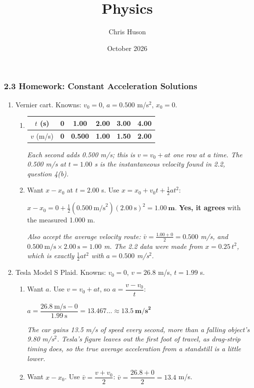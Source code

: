 \documentclass[12pt, twoside]{article}
\title{Physics}
\author{Chris Huson}
\date{October 2026}
\begin{document}
\subsubsection*{2.3 Homework: Constant Acceleration Solutions}

\begin{enumerate}[itemsep=0.5cm]

\item Vernier cart. Knowns: $v_0 = 0$, $a = 0.500$ m/s$^2$, $x_0 = 0$.
  \begin{enumerate}[itemsep=0.3cm]
    \item \renewcommand{\arraystretch}{1.4}
      \begin{tabular}[t]{| c | c | c | c | c | c |}
        \hline
        $t$ (s) & 0 & 1.00 & 2.00 & 3.00 & 4.00 \\ \hline
        $v$ (m/s) & \textbf{0} & \textbf{0.500} & \textbf{1.00} & \textbf{1.50}
          & \textbf{2.00} \\ \hline
      \end{tabular}

      \emph{Each second adds 0.500 m/s; this is $v = v_0 + at$ one row at a time.
      The 0.500 m/s at $t = 1.00$ s is the instantaneous velocity found in 2.2,
      question 4(b).}
    \item Want $x - x_0$ at $t = 2.00$ s. Use $x = x_0 + v_0 t + \frac{1}{2}at^2$:

      $x - x_0 = 0 + \tfrac{1}{2}(0.500~\text{m/s}^2)(2.00~\text{s})^2
      = \mathbf{1.00~\textbf{m}}$. \quad \textbf{Yes, it agrees} with the measured
      1.000 m.

      \emph{Also accept the average velocity route:
      $\bar{v} = \frac{1.00 + 0}{2} = 0.500$ m/s, and
      $0.500~\text{m/s} \times 2.00~\text{s} = 1.00$ m. The 2.2 data were made from
      $x = 0.25\,t^2$, which is exactly $\frac{1}{2}at^2$ with $a = 0.500$ m/s$^2$.}
  \end{enumerate}

\item Tesla Model S Plaid. Knowns: $v_0 = 0$, $v = 26.8$ m/s, $t = 1.99$ s.
  \begin{enumerate}[itemsep=0.3cm]
    \item Want $a$. Use $v = v_0 + at$, so $a = \dfrac{v - v_0}{t}$:

      $a = \dfrac{26.8~\text{m/s} - 0}{1.99~\text{s}} = 13.467\ldots
      \approx \mathbf{13.5~\textbf{m/s}^2}$

      \emph{The car gains 13.5 m/s of speed every second, more than a falling
      object's 9.80 m/s$^2$. Tesla's figure leaves out the first foot of travel, as
      drag-strip timing does, so the true average acceleration from a standstill is
      a little lower.}
    \item Want $x - x_0$. Use $\bar{v} = \dfrac{v + v_0}{2}$:
      $\bar{v} = \dfrac{26.8 + 0}{2} = 13.4$ m/s.


\end{enumerate}
\end{enumerate}
\end{document}
